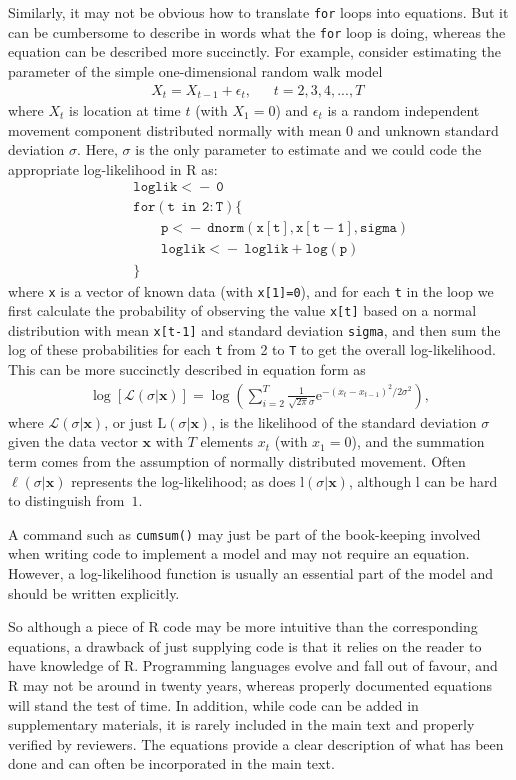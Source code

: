 \documentclass[12pt]{article}
\newcommand{\eb}{\begin{eqnarray}}
\newcommand{\ee}{\end{eqnarray}}
\begin{document}
Similarly, it may not be obvious how to translate {\tt for} loops into
equations. But it can be cumbersome to describe in words what the {\tt for} loop is
doing, whereas the equation can be described more succinctly.
For example,
consider estimating the parameter of the simple one-dimensional
random walk model
\eb
X_t = X_{t-1} + \epsilon_t, ~~~~~~~t=2, 3, 4, ..., T\,\
\ee
where $X_t$ is location at time $t$ (with $X_1 = 0$)
and $\epsilon_t$ is a random independent
movement component distributed normally with mean 0 and unknown standard
deviation $\sigma$. 
Here, $\sigma$ is the only parameter to estimate and we could code the
appropriate log-likelihood in R as:
\eb
\nonumber
&&\mathtt{loglik <\!\!\!- ~ 0}\\
\nonumber
&&\mathtt{for(t ~~ in ~~ 2:T)\{}\\
\nonumber
&&~~~~~~~~~ \mathtt{p <\!\!\!- ~dnorm(x[t],x[t-1],sigma)}\\
\nonumber
&&~~~~~~~~~ \mathtt{loglik <\!\!\!- ~loglik + log(p)}\\
\nonumber
&&\}
\label{forloop}
\ee
where \texttt{x} is a vector of known data (with \texttt{x[1]=0}),
and for each \texttt{t} in the loop we first calculate the probability of
observing the value \texttt{x[t]}
based on a normal distribution with mean \texttt{x[t-1]} and standard deviation
\texttt{sigma}, and then sum the log of these probabilities for each \texttt{t}
from 2 to \texttt{T} to get the
overall log-likelihood. This can be more succinctly described in equation form as
\eb
\log \left[\mathcal{L}\left( \sigma | \mathbf{x} \right) \right] =
  \log \left( \sum_{i=2}^T \frac{1}{\sqrt{2 \pi} \sigma}
  \mbox{e}^{-(x_t - x_{t-1})^2 / 2 \sigma^2 }\right), 
\label{ll}
\ee
where $\mathcal{L}\left( \sigma | \mathbf{x} \right)$,
or just $\mbox{L}\left( \sigma | \mathbf{x} \right)$,
is the likelihood of the
standard deviation $\sigma$ given the data vector $\mathbf{x}$ with $T$ elements
$x_t$ (with $x_1=0$), and the summation term comes from the assumption of normally distributed
movement. Often $\ell\left( \sigma | \mathbf{x} \right)$ represents the
log-likelihood; as does $\mbox{l}\left( \sigma | \mathbf{x} \right)$, although l can
be hard to distinguish from~$1$.

A command such as \texttt{cumsum()} may just be part of the book-keeping
involved when writing code to implement a model and may not require an
equation. However, a log-likelihood function is usually an essential part of the
model and should be written explicitly.

So although a piece of R code may be more intuitive than the corresponding
equations, a drawback of just supplying code is that it relies on the reader to
have knowledge of R. Programming languages evolve and fall out of favour, and R
may not be around in twenty years, whereas properly documented equations will
stand the test of time.  In addition, while code can be added in supplementary
materials, it is rarely included in the main text and properly verified by
reviewers. The equations provide a clear description of what has been done and
can often be incorporated in the main text. 
\end{document}
